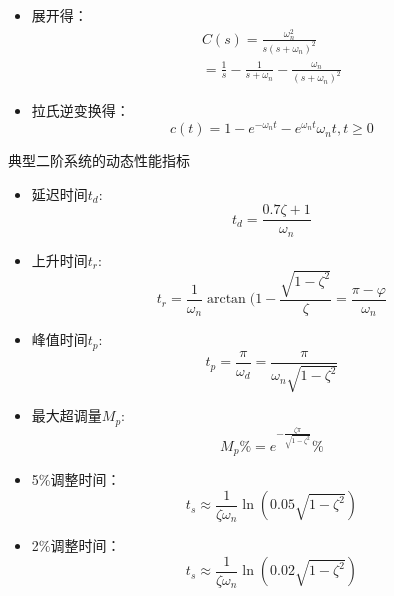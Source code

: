 \begin{frame}
\begin{block}{}
\begin{itemize}
\item<+-> 展开得：
\begin{eqnarray*}
C(s)=\frac{\omega_n^2}{s(s+\omega_n)^2}\\
=\frac{1}{s}-\frac{1}{s+\omega_n}-\frac{\omega_n}{(s+\omega_n)^2}
\end{eqnarray*} 
\item<+-> 拉氏逆变换得：
\[c(t)=1-e^{-\omega_nt}-e^{\omega_nt}\omega_nt,t\geq 0\]
\end{itemize}
\end{block}
\end{frame}
\begin{frame}{典型二阶系统的动态性能指标}
\begin{block}{}
\begin{itemize}
\item<+-> 延迟时间$t_d$:
\[t_d=\frac{0.7\zeta+1}{\omega_n}\]
\item<+-> 上升时间$t_r$:
\[t_r=\frac{1}{\omega_n}\arctan(1-\frac{\sqrt{1-\zeta^2}}{\zeta}=\frac{\pi-\varphi}{\omega_n}\]
\end{itemize}
\end{block}
\end{frame}
\begin{frame}
\begin{block}{}
\begin{itemize}
\item<+-> 峰值时间$t_p$:
\[t_p=\frac{\pi}{\omega_d}=\frac{\pi}{\omega_n\sqrt{1-\zeta^2}}\]
\item<+-> 最大超调量$M_p$:
\[M_p\%=e^{-\frac{\zeta\pi}{\sqrt{1-\zeta^2}}}\%\]
\end{itemize}
\end{block}
\end{frame}
\begin{frame}
\begin{block}{}
\begin{itemize}
\item<+-> 5\%调整时间：
\[t_s\approx\frac{1}{\zeta\omega_n}\ln(0.05\sqrt{1-\zeta^2})\]
\item<+-> 2\%调整时间：
\[t_s\approx\frac{1}{\zeta\omega_n}\ln(0.02\sqrt{1-\zeta^2})\]
\end{itemize}
\end{block}
\end{frame}
\endinput